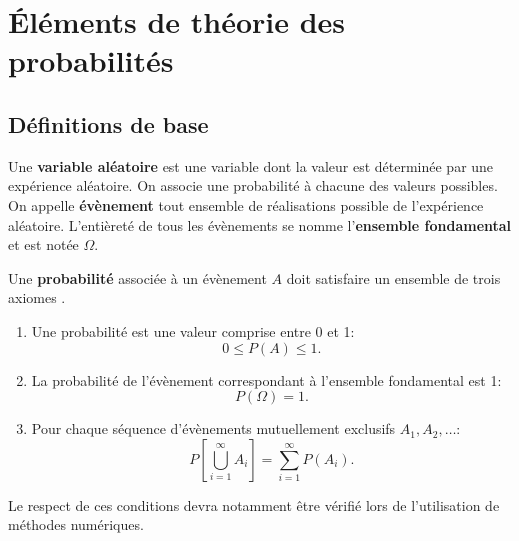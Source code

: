 \chapter{Éléments de théorie des probabilités}

\section{Définitions de base}
\label{sec:introvariablealeatoire}

Une \textbf{variable aléatoire} est une variable dont la valeur est
déterminée par une expérience aléatoire. On associe une probabilité à
chacune des valeurs possibles. On appelle \textbf{évènement} tout
ensemble de réalisations possible de l'expérience
aléatoire. L'entièreté de tous les évènements se nomme
l'\textbf{ensemble fondamental} et est notée $\Omega$.

Une \textbf{probabilité} associée à un évènement $A$ doit satisfaire
un ensemble de trois axiomes \citep{dodge2004statistique}.
\begin{enumerate}
\item Une probabilité est une valeur comprise entre 0 et 1:
  \begin{equation}
    \label{eq:condition1probabilite}
    0 \leq P(A) \leq 1.
  \end{equation}

\item La probabilité de l'évènement correspondant à l'ensemble
  fondamental est 1:
  \begin{equation}
    \label{eq:condition2probabilite}
    P(\Omega) = 1.
  \end{equation}

\item Pour chaque séquence d'évènements mutuellement exclusifs
  $A_1,A_2,\ldots$:
  \begin{equation}
    \label{eq:condition3probabilite}
    P \left[ \bigcup_{i=1}^{\infty} A_i \right] = \sum_{i=1}^{\infty} P(A_i).
  \end{equation}
\end{enumerate}

Le respect de ces conditions devra notamment être vérifié lors de
l'utilisation de méthodes numériques.


